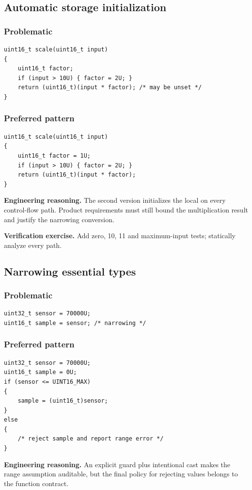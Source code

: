 \documentclass[10pt,letterpaper]{article}
\begin{document}
\subsection{Automatic storage initialization}
\subsubsection*{Problematic}
\begin{lstlisting}[style=engineerc]
uint16_t scale(uint16_t input)
{
    uint16_t factor;
    if (input > 10U) { factor = 2U; }
    return (uint16_t)(input * factor); /* may be unset */
}
\end{lstlisting}
\subsubsection*{Preferred pattern}
\begin{lstlisting}[style=engineerc]
uint16_t scale(uint16_t input)
{
    uint16_t factor = 1U;
    if (input > 10U) { factor = 2U; }
    return (uint16_t)(input * factor);
}
\end{lstlisting}
\textbf{Engineering reasoning.} The second version initializes the local on every control-flow path. Product requirements must still bound the multiplication result and justify the narrowing conversion.

\textbf{Verification exercise.} Add zero, 10, 11 and maximum-input tests; statically analyze every path.

\subsection{Narrowing essential types}
\subsubsection*{Problematic}
\begin{lstlisting}[style=engineerc]
uint32_t sensor = 70000U;
uint16_t sample = sensor; /* narrowing */
\end{lstlisting}
\subsubsection*{Preferred pattern}
\begin{lstlisting}[style=engineerc]
uint32_t sensor = 70000U;
uint16_t sample = 0U;
if (sensor <= UINT16_MAX)
{
    sample = (uint16_t)sensor;
}
else
{
    /* reject sample and report range error */
}
\end{lstlisting}
\textbf{Engineering reasoning.} An explicit guard plus intentional cast makes the range assumption auditable, but the final policy for rejecting values belongs to the function contract.
\end{document}
